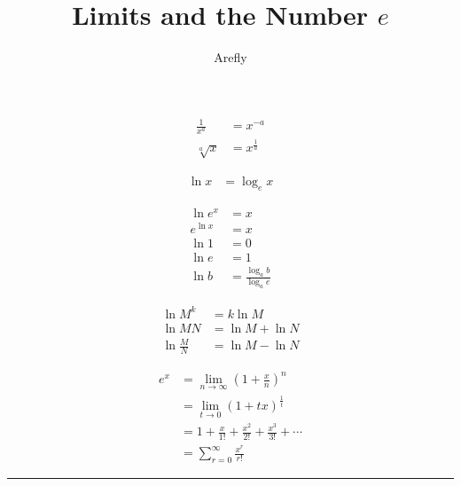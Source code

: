 \documentclass{article}
\title{Limits and the Number $e$}
\author{Arefly}
\begin{document}
\begin{multicols}{2}

\noindent\begin{align*}
	\frac{1}{x^a} &= x^{-a} \\
	\sqrt[a]{x} &= x^{\frac{1}{a}}
\end{align*}

\begin{align*}
	\ln x &= \log_e x
\end{align*}

\begin{align*}
	\ln e^x &= x \\
	e^{\ln x} &= x \\
	\ln 1 &= 0 \\
	\ln e &= 1 \\
	\ln b &= \frac{\log_a b}{\log_a e}
\end{align*}

\columnbreak

\noindent\begin{align*}
	\ln M^k &= k\ln M \\
	\ln MN &= \ln M + \ln N \\
	\ln \frac{M}{N} &= \ln M - \ln N
\end{align*}

\begin{align*}
	e^x &= \lim_{n \to \infty} (1+\frac{x}{n})^n \\
	&= \lim_{t \to 0} (1+tx)^{\frac{1}{t}} \\
	&= 1+\frac{x}{1!}+\frac{x^2}{2!}+\frac{x^3}{3!}+\cdots \\
	&= \sum_{r=0}^{\infty} \frac{x^r}{r!}
\end{align*}

\end{multicols}

\noindent\rule{\textwidth}{0.2pt}
\end{document}
